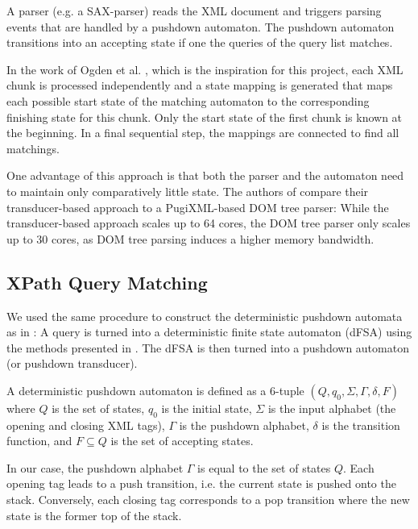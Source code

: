 A parser (e.g. a SAX-parser) reads the XML document and triggers parsing events
that are handled by a pushdown automaton. The pushdown automaton transitions
into an accepting state if one the queries of the query list matches.

In the work of Ogden et al. \cite{Ogden2013}, which is the inspiration for this
project, each XML chunk is processed independently and a state mapping is
generated that maps each possible start state of the matching automaton to the
corresponding finishing state for this chunk. Only the start state of the first
chunk is known at the beginning. In a final sequential step, the mappings are
connected to find all matchings.

One advantage of this approach is that both the parser and the automaton need
to maintain only comparatively little state. The authors of \cite{Ogden2013}
compare their transducer-based approach to a PugiXML-based DOM tree parser:
While the transducer-based approach scales up to 64 cores, the DOM tree parser
only scales up to 30 cores, as DOM tree parsing induces a higher memory
bandwidth. 

\subsection{XPath Query Matching}
We used the same procedure to construct the deterministic pushdown automata as
in \cite{Ogden2013}: A query is turned into a deterministic finite state
automaton (dFSA) using the methods presented in \cite{Green2004}. The dFSA is
then turned into a pushdown automaton (or pushdown transducer).

A deterministic pushdown automaton is defined as a 6-tuple $(Q, q_0, \Sigma,
\Gamma, \delta, F)$ where $Q$ is the set of states, $q_0$ is the initial state,
$\Sigma$ is the input alphabet (the opening and closing XML tags), $\Gamma$ is
the pushdown alphabet, $\delta$ is the transition function, and $F \subseteq Q$ is
the set of accepting states.

In our case, the pushdown alphabet $\Gamma$ is equal to the set of states $Q$.
Each opening tag leads to a push transition, i.e. the current state is pushed
onto the stack. Conversely, each closing tag corresponds to a pop transition
where the new state is the former top of the stack.


